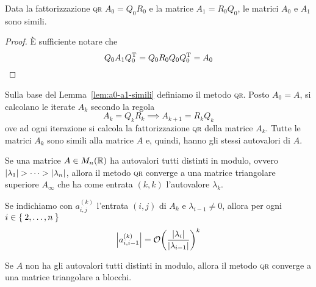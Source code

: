 	\begin{lemma}\label{lem:a0-a1-simili}
		Data la fattorizzazione \textsc{qr} \(A_0 = Q_0 R_0\) e la matrice \(A_1 = R_0 Q_0\), le matrici \(A_0\) e \(A_1\) sono simili.
	\end{lemma}
	
	\begin{proof}
		È sufficiente notare che
		\begin{equation*}
			Q_0 A_1 Q_0^\mathrm{T}\relax = Q_0 R_0 Q_0 Q_0^\mathrm{T}\relax = A_0 \qedhere
		\end{equation*}
	\end{proof}

	Sulla base del Lemma~\ref{lem:a0-a1-simili} definiamo il metodo \textsc{qr}. Posto \(A_0 = A\), si calcolano le iterate \(A_k\) secondo la regola
	\begin{equation}
		A_k = Q_k R_k \implies A_{k + 1} = R_k Q_k
	\end{equation}
	ove ad ogni iterazione si calcola la fattorizzazione \textsc{qr} della matrice \(A_k\). Tutte le matrici \(A_k\) sono simili alla matrice \(A\) e, quindi, hanno gli stessi autovalori di \(A\).
	
	\begin{teorema}\label{th:metodo-qr-converge}
		Se una matrice \(A \in M_n (\mathbb{R})\) ha autovalori tutti distinti in modulo, ovvero \(\abs{\lambda_1} > \dots > \abs{\lambda_n}\), allora il metodo \textsc{qr} converge a una matrice triangolare superiore \(A_\infty\) che ha come entrata \((k, k)\) l'autovalore \(\lambda_k\).
		
		Se indichiamo con \(a_{i, j}^{(k)}\) l'entrata \((i, j)\) di \(A_k\) e \(\lambda_{i - 1} \ne 0\), allora per ogni \(i \in \Set{2, \dots, n}\)
		\begin{equation}\label{eq:metodo-qr-converge}
			\abs{a_{i, i - 1}^{(k)}} = \order{\frac{\abs{\lambda_i}}{\abs{\lambda_{i - 1}}}}^k
		\end{equation}
		
		Se \(A\) non ha gli autovalori tutti distinti in modulo, allora il metodo \textsc{qr} converge a una matrice triangolare a blocchi.
	\end{teorema}

